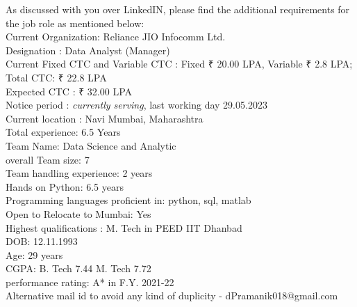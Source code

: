 As discussed with you over LinkedIN, please find the additional requirements for the job role as mentioned below:
\\[5pt]
Current Organization: Reliance JIO Infocomm Ltd. \\
Designation : Data Analyst (Manager) \\
Current Fixed CTC and Variable CTC : Fixed ₹ 20.00 LPA, Variable ₹ 2.8 LPA; Total CTC: ₹ 22.8 LPA \\
Expected CTC : ₹ 32.00 LPA \\
Notice period : \textit{currently serving}, last working day 29.05.2023 \\
Current location : Navi Mumbai, Maharashtra \\
Total experience: 6.5 Years \\
Team Name: Data Science and Analytic \\
overall Team size: 7 \\
Team handling experience: 2 years \\
Hands on Python: 6.5 years \\
Programming languages proficient in: python, sql, matlab \\
Open to Relocate to Mumbai: Yes \\
Highest qualifications : M. Tech in PEED IIT Dhanbad \\
DOB: 12.11.1993 \\
Age: 29 years \\
CGPA: B. Tech 7.44 M. Tech 7.72 \\
performance rating: A* in F.Y. 2021-22\\
Alternative mail id to avoid any kind of duplicity - dPramanik018@gmail.com \\